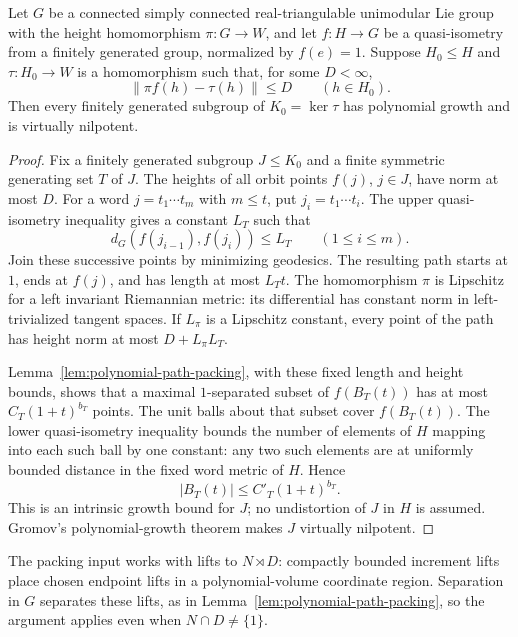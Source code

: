 \begin{lemma}\label{lem:height-kernel-growth}
Let $G$ be a connected simply connected real-triangulable unimodular Lie group with the height
homomorphism $\pi:G\to W$, and let $f:H\to G$ be a quasi-isometry from
a finitely generated group, normalized by $f(e)=1$.  Suppose $H_0\leq H$
and $\tau:H_0\to W$ is a homomorphism such that, for some $D<\infty$,
\begin{equation}\label{eq:recognition-corrected-height}
 \|\pi f(h)-\tau(h)\|\leq D\qquad(h\in H_0).
\end{equation}
Then every finitely generated subgroup of $K_0=\ker\tau$ has polynomial
growth and is virtually nilpotent.
\end{lemma}

\begin{proof}
Fix a finitely generated subgroup $J\leq K_0$ and a finite symmetric
generating set $T$ of $J$.  The heights of all orbit points $f(j)$,
$j\in J$, have norm at most $D$.  For a word
$j=t_1\cdots t_m$ with $m\leq t$, put
$j_i=t_1\cdots t_i$.  The upper quasi-isometry inequality gives a
constant $L_T$ such that
\[
 d_G(f(j_{i-1}),f(j_i))\leq L_T
 \qquad(1\leq i\leq m).
\]
Join these successive points by minimizing geodesics.  The resulting
path starts at $1$, ends at $f(j)$, and has length at most $L_Tt$.
The homomorphism $\pi$ is Lipschitz for a left invariant Riemannian
metric: its differential has constant norm in left-trivialized tangent
spaces.  If $L_\pi$ is a Lipschitz constant, every point of the path has
height norm at most $D+L_\pi L_T$.

Lemma~\ref{lem:polynomial-path-packing}, with these fixed length and
height bounds, shows that a maximal $1$-separated subset of
$f(B_T(t))$ has at most $C_T(1+t)^{b_T}$ points.  The unit balls about
that subset cover $f(B_T(t))$.  The lower quasi-isometry inequality
bounds the number of elements of $H$ mapping into each such ball by
one constant: any two such elements are at uniformly bounded distance
in the fixed word metric of $H$.  Hence
\[
 |B_T(t)|\leq C'_T(1+t)^{b_T}.
\]
This is an intrinsic growth bound for $J$; no undistortion of $J$ in $H$
is assumed.  Gromov's polynomial-growth theorem
\cite[Main Theorem, p.~54]{Gromov1981} makes $J$ virtually nilpotent.
\end{proof}

The packing input works with lifts to $N\rtimes D$:
compactly bounded increment lifts place chosen endpoint lifts in a
polynomial-volume coordinate region.  Separation in $G$ separates
these lifts, as in Lemma~\ref{lem:polynomial-path-packing}, so the
argument applies even when $N\cap D\ne\{1\}$.


